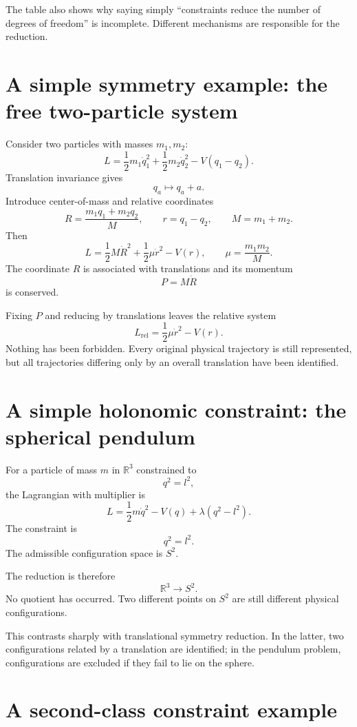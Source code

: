 \documentclass[11pt,a4paper]{article}
\newcommand{\R}{\mathbb R}
\theoremstyle{definition}
\begin{document}
The table also shows why saying simply ``constraints reduce the number of
degrees of freedom'' is incomplete.  Different mechanisms are responsible
for the reduction.

\section{A simple symmetry example: the free two-particle system}

Consider two particles with masses $m_1,m_2$:
\[
        L=
        \frac12m_1\dot q_1^2+
        \frac12m_2\dot q_2^2-
        V(q_1-q_2).
\]
Translation invariance gives
\[
        q_a\mapsto q_a+a.
\]
Introduce center-of-mass and relative coordinates
\[
        R=\frac{m_1q_1+m_2q_2}{M},
        \qquad
        r=q_1-q_2,
        \qquad
        M=m_1+m_2.
\]
Then
\[
        L=
        \frac12M\dot R^2+
        \frac12\mu\dot r^2-V(r),
        \qquad
        \mu=\frac{m_1m_2}{M}.
\]
The coordinate $R$ is associated with translations and its momentum
\[
        P=M\dot R
\]
is conserved.

Fixing $P$ and reducing by translations leaves the relative system
\[
        L_{\mathrm{rel}}
        =
        \frac12\mu\dot r^2-V(r).
\]
Nothing has been forbidden.  Every original physical trajectory is still
represented, but all trajectories differing only by an overall translation
have been identified.

\section{A simple holonomic constraint: the spherical pendulum}

For a particle of mass $m$ in $\R^3$ constrained to
\[
        q^2=l^2,
\]
the Lagrangian with multiplier is
\[
        L=
        \frac12m\dot q^2
        -V(q)
        +\lambda(q^2-l^2).
\]
The constraint is
\[
        q^2=l^2.
\]
The admissible configuration space is $S^2$.

The reduction is therefore
\[
        \R^3\longrightarrow S^2.
\]
No quotient has occurred.  Two different points on $S^2$ are still different
physical configurations.

This contrasts sharply with translational symmetry reduction.  In the latter,
two configurations related by a translation are identified; in the pendulum
problem, configurations are excluded if they fail to lie on the sphere.

\section{A second-class constraint example}
\end{document}
